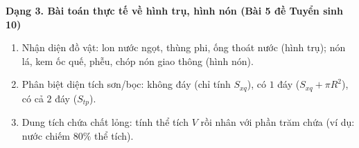 \textbf{Dạng 3. Bài toán thực tế về hình trụ, hình nón (Bài 5 đề Tuyển sinh 10)}
\begin{enumerate}
\item Nhận diện đồ vật: lon nước ngọt, thùng phi, ống thoát nước (hình trụ); nón lá, kem ốc quế, phễu, chóp nón giao thông (hình nón).
\item Phân biệt diện tích sơn/bọc: không đáy (chỉ tính $S_{xq}$), có $1$ đáy ($S_{xq} + \pi R^2$), có cả $2$ đáy ($S_{tp}$).
\item Dung tích chứa chất lỏng: tính thể tích $V$ rồi nhân với phần trăm chứa (ví dụ: nước chiếm $80\%$ thể tích).
\end{enumerate}
